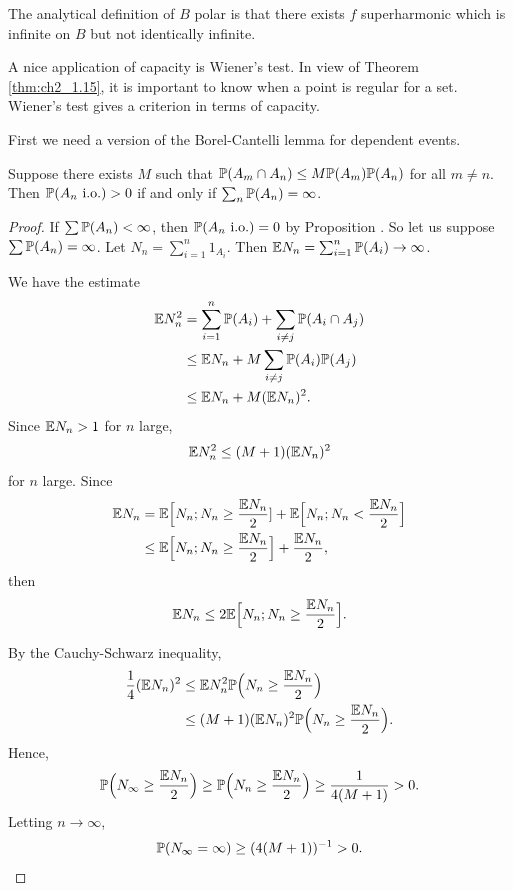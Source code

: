The analytical definition of $B$ polar is that there exists $f$ superharmonic which is infinite on $B$ but not identically infinite.


A nice application of capacity is Wiener's test. In view of Theorem \ref{thm:ch2_1.15}, it is important to know when a point is regular for a set. Wiener's test gives a criterion in terms of capacity.

First we need a version of the Borel-Cantelli lemma for dependent events.

\begin{proposition}\label{prop:ch2_5.14}
Suppose there exists $M$ such that $\P(A_m \cap A_n) \leq M\P(A_m)\P(A_n)$ for all $m \neq n$. Then $\P(A_n~\textnormal{i.o.}) > 0$ if and only if $\sum_n\P(A_n) = \infty$.
\end{proposition}

\begin{proof}
If $\sum\P(A_n) < \infty$, then $\P(A_n~\text{i.o.}) = 0$ by Proposition . So let us suppose $\sum\P(A_n) = \infty$. Let $N_n = \sum_{i=1}^n 1_{A_i}$. Then $\E N_n = \sum_{i=1}^n \P(A_i) \to \infty$.

We have the estimate
\begin{align*}
    \E N_n^2 &= \sum_{i=1}^n \P(A_i) + \sum_{i\neq j}\P(A_i \cap A_j) \\
    &\leq \E N_n + M\sum_{i\neq j}\P(A_i)\P(A_j) \\
    &\leq \E N_n + M(\E N_n)^2.
\end{align*}
Since $\E N_n > 1$ for $n$ large,
\[
    \E N_n^2 \leq (M + 1)(\E N_n)^2
\]
\mnewpage
for $n$ large. Since
\begin{align*}
    \E N_n &= \E\Big[N_n; N_n \geq \frac{\E N_n}{2}] + \E\Big[N_n; N_n < \frac{\E N_n}{2}\Big] \\
    &\leq \E\Big[N_n; N_n \geq \frac{\E N_n}{2}\Big] + \frac{\E N_n}{2},
\end{align*}
then
\[
    \E N_n \leq 2\E\Big[N_n; N_n \geq \frac{\E N_n}{2}\Big].
\]

By the Cauchy-Schwarz inequality,
\begin{align*}
    \frac{1}{4}(\E N_n)^2 &\leq \E N_n^2\P\Big(N_n \geq \frac{\E N_n}{2}\Big) \\
    &\leq (M+1)(\E N_n)^2\P\Big(N_n \geq \frac{\E N_n}{2}\Big).
\end{align*}
Hence,
\[
    \P\Big(N_\infty \geq \frac{\E N_n}{2}\Big) \geq \P\Big(N_n \geq \frac{\E N_n}{2}\Big) \geq \frac{1}{4(M+1)} > 0.
\]
Letting $n \to \infty$,
\[
    \P(N_\infty = \infty) \geq (4(M+1))^{-1} > 0.
\]
\end{proof}

